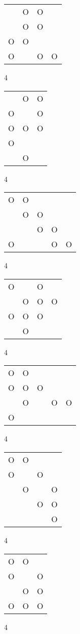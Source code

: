 \begin{tabular}{|m{0.2cm}m{0.2cm}m{0.2cm}m{0.2cm}|}\hline
 &O&O& \\
 &O&O& \\
O&O& & \\
O& &O&O\\
\hline\end{tabular}4
\begin{tabular}{|m{0.2cm}m{0.2cm}m{0.2cm}|}\hline
 &O&O\\
O& &O\\
O&O&O\\
O& & \\
 &O& \\
\hline\end{tabular}4
\begin{tabular}{|m{0.2cm}m{0.2cm}m{0.2cm}m{0.2cm}m{0.2cm}|}\hline
O&O& & & \\
 &O&O& & \\
 & &O&O& \\
O& & &O&O\\
\hline\end{tabular}4
\begin{tabular}{|m{0.2cm}m{0.2cm}m{0.2cm}m{0.2cm}|}\hline
O& &O& \\
 &O&O&O\\
O&O&O& \\
 &O& & \\
\hline\end{tabular}4
\begin{tabular}{|m{0.2cm}m{0.2cm}m{0.2cm}m{0.2cm}m{0.2cm}|}\hline
O&O& & & \\
O&O&O& & \\
 &O& &O&O\\
O& & & & \\
\hline\end{tabular}4
\begin{tabular}{|m{0.2cm}m{0.2cm}m{0.2cm}m{0.2cm}|}\hline
O&O& & \\
O& &O& \\
 &O& &O\\
 & &O&O\\
 & & &O\\
\hline\end{tabular}4
\begin{tabular}{|m{0.2cm}m{0.2cm}m{0.2cm}|}\hline
O&O& \\
O& &O\\
 &O&O\\
O&O&O\\
\hline\end{tabular}4
